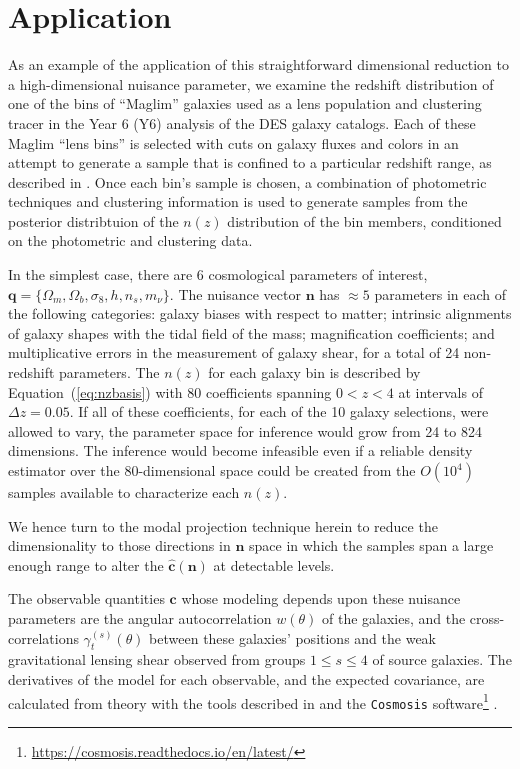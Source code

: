 \documentclass[linenumbers, onecolumn]{aastex7}
\newcommand{\eqq}[1]{Equation~(\ref{#1})}
\newcommand{\vecc}{\ensuremath{\mathbf{c}}}
\newcommand{\vecq}{\ensuremath{\mathbf{q}}}
\newcommand{\vecn}{\ensuremath{\mathbf{n}}}
\newcommand{\hatc}{\ensuremath{\hat{\mathbf{c}}}}
\begin{document}
\section{Application}\label{sec:app}
As an example of the application of this straightforward dimensional
reduction to a high-dimensional nuisance parameter, we examine the
redshift distribution of one of the bins of ``Maglim''  galaxies used
as a lens population and clustering tracer in the Year 6 (Y6) analysis of
the DES galaxy catalogs.  Each of these Maglim ``lens bins''
is selected with cuts on galaxy fluxes and
colors in an attempt to generate a sample that is confined to a
particular redshift range, as described in \citet{y6maglim}.  Once each bin's
sample is chosen, a combination of 
photometric techniques \citep{y6lenspz,y6pz} and clustering information
\citep{y6wz} is used to generate samples from the posterior
distribtuion of  the $n(z)$ distribution of the bin members, conditioned
on the photometric and clustering data.

In the simplest case,
there are 6 cosmological parameters of interest, $\vecq = \{\Omega_m,
\Omega_b, \sigma_8, h, n_s, m_\nu\}.$   The nuisance vector $\vecn$
has $\approx 5$  parameters in each of the following categories: galaxy
biases with respect to matter; intrinsic alignments of galaxy shapes
with the tidal field of the mass; magnification coefficients; and multiplicative errors in the
measurement of galaxy shear, for a total of 24 non-redshift parameters.  The $n(z)$ for each galaxy bin
is
described by \eqq{eq:nzbasis} with 80 coefficients spanning $0<z<4$ at
intervals of $\Delta z=0.05.$ If all of these coefficients, for each
of the 10 galaxy selections, were allowed to vary, the parameter space for inference would grow from 24 to 824 dimensions.
The inference would become infeasible even if a
reliable density estimator over the 80-dimensional space could be
created from the $O(10^4)$ samples available to characterize each
$n(z).$ 

We hence turn to the modal projection technique herein to reduce the
dimensionality to those directions in $\vecn$ space in which the samples span a large
enough range to alter the $\hatc(\vecn)$ at detectable levels. 

The observable quantities $\vecc$ whose modeling depends upon these nuisance
parameters are the angular autocorrelation $w(\theta)$ of the 
galaxies, and the cross-correlations $\gamma_t^{(s)}(\theta)$ between
these galaxies' positions and the weak gravitational lensing shear
observed from groups $1\le s \le 4$ of source galaxies.  The
derivatives of the model for each observable, and the expected
covariance, are calculated from theory with the tools described in
\citet{y6model} and the \texttt{Cosmosis} software\footnote{\url{https://cosmosis.readthedocs.io/en/latest/}} \citep{cosmosis}.
\end{document}
